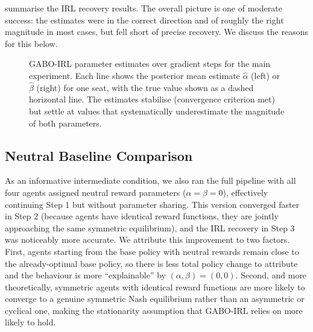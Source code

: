 \documentclass{article}
\begin{document}
 summarise the IRL recovery results. The overall picture is one of moderate success: the estimates were in the correct direction and of roughly the right magnitude in most cases, but fell short of precise recovery. We discuss the reasons for this below.

\begin{figure}[t]
\centering
\caption{GABO-IRL parameter estimates over gradient steps for the main experiment. Each line shows the posterior mean estimate $\hat\alpha$ (left) or $\hat\beta$ (right) for one seat, with the true value shown as a dashed horizontal line. The estimates stabilise (convergence criterion met) but settle at values that systematically underestimate the magnitude of both parameters.}
\label{fig:irl_convergence}
\end{figure}

\subsection{Neutral Baseline Comparison}

As an informative intermediate condition, we also ran the full pipeline with all four agents assigned neutral reward parameters ($\alpha = \beta = 0$), effectively continuing Step 1 but without parameter sharing. This version converged faster in Step 2 (because agents have identical reward functions, they are jointly approaching the same symmetric equilibrium), and the IRL recovery in Step 3 was noticeably more accurate. We attribute this improvement to two factors. First, agents starting from the base policy with neutral rewards remain close to the already-optimal base policy, so there is less total policy change to attribute and the behaviour is more ``explainable'' by $(\alpha, \beta) = (0, 0)$. Second, and more theoretically, symmetric agents with identical reward functions are more likely to converge to a genuine symmetric Nash equilibrium rather than an asymmetric or cyclical one, making the stationarity assumption that GABO-IRL relies on more likely to hold.
\end{document}
